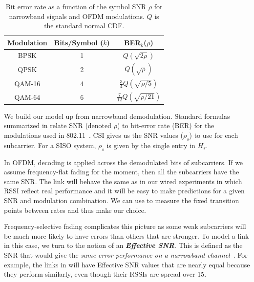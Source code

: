 \begin{table}
\centering
\begin{tabular}{ccc}
\toprule
Modulation & Bits/Symbol ($k$) & BER$_k$($\rho$) \\
\midrule BPSK & 1 & $Q\left(\sqrt{2\rho}\right)$ \\
QPSK & 2 & $Q\left(\sqrt{\rho}\right)$\\
QAM-16 & 4 & $\frac{3}{4}Q\left(\sqrt{\rho/5}\right)$\\
QAM-64 & 6 & $\frac{7}{12}Q\left(\sqrt{\rho/21}\right)$\\
\bottomrule
\end{tabular}
\caption[Bit error rate as a function of the symbol SNR for OFDM modulations]{\label{tab:ber_snr}Bit error rate as a function of the symbol SNR $\rho$ for narrowband signals and OFDM modulations. $Q$ is the standard normal CDF\@.}
\end{table}

We build our model up from narrowband demodulation. 
Standard formulas summarized in  relate SNR (denoted $\rho$) to bit-error rate (BER) for the modulations used in 802.11~\cite{Goldsmith}. CSI gives us the SNR values ($\rho_s$) to use for each subcarrier. For a SISO system, $\rho_s$ is given by the single entry in $H_s$.

In OFDM, decoding is applied across the demodulated bits of subcarriers. If we assume frequency-flat fading for the moment, then all the subcarriers have the same SNR\@. The link will behave the same as in our wired experiments in which RSSI reflect real performance and it will be easy to make predictions for a given SNR and modulation combination. We can use  to measure the fixed transition points between rates and thus make our choice.

Frequency-selective fading complicates this picture as some weak subcarriers will be much more likely to have errors than others that are stronger. To model a link in this case, we turn to the notion of an \textbf{\em Effective SNR}. This is defined as the SNR that would give the \emph{same error performance on a narrowband channel}~\cite{nanda_effectiveSNR}. For example, the links in  will have Effective SNR values that are nearly equal because they perform similarly, even though their RSSIs are spread over 15\dB.

